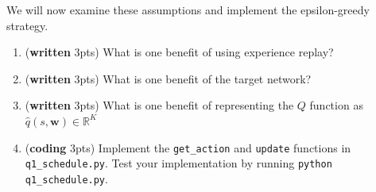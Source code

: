 \documentclass{article}
\begin{document}
We will now examine these assumptions and implement the epsilon-greedy strategy.

\begin{enumerate}
\item (\textbf{written} 3pts) What is one benefit of using experience replay?

\item (\textbf{written} 3pts) What is one benefit of the target network?

\item (\textbf{written} 3pts) What is one benefit of representing the $Q$ function as $ \hat{q}(s, \textbf{w}) \in \mathbb{R}^{K} $

\item (\textbf{coding} 3pts) Implement the \texttt{get\_action} and \texttt{update} functions in \texttt{q1\_schedule.py}. Test your implementation by running \texttt{python q1\_schedule.py}.
\end{enumerate}
\end{document}
